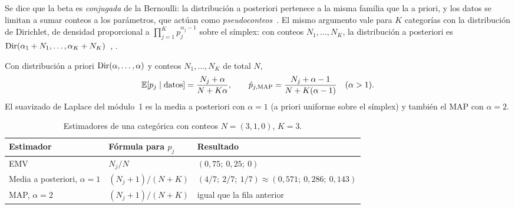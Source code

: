 Se dice que la beta es \emph{conjugada} de la Bernoulli: la distribución a posteriori pertenece a la misma familia que la a priori, y los datos se limitan a sumar conteos a los parámetros, que actúan como \emph{pseudoconteos}~\cite[clase~15]{mit1805}. El mismo argumento vale para $K$ categorías con la distribución de Dirichlet, de densidad proporcional a $\prod_{j=1}^{K}p_j^{\alpha_j-1}$ sobre el símplex: con conteos $N_1,\dots,N_K$, la distribución a posteriori es $\operatorname{Dir}(\alpha_1+N_1,\dots,\alpha_K+N_K)$~\cite[§2.2.1]{bishop}, \cite[§6.6]{mml}.

\begin{corolario}\label{cor:laplace}
Con distribución a priori $\operatorname{Dir}(\alpha,\dots,\alpha)$ y conteos $N_1,\dots,N_K$ de total $N$,
\[
\mathbb{E}[p_j\mid\text{datos}]=\frac{N_j+\alpha}{N+K\alpha},\qquad
\hat p_{j,\mathrm{MAP}}=\frac{N_j+\alpha-1}{N+K(\alpha-1)}\quad(\alpha>1).
\]
El suavizado de Laplace del módulo~1 es la media a posteriori con $\alpha=1$ (a priori uniforme sobre el símplex) y también el MAP con $\alpha=2$.
\end{corolario}

\begin{table}[h]
\centering\small
\caption{Estimadores de una categórica con conteos $N=(3,1,0)$, $K=3$.}\label{tab:estimadores}
\begin{tabular}{@{}lll@{}}
\toprule
Estimador & Fórmula para $p_j$ & Resultado \\
\midrule
EMV & $N_j/N$ & $(0{,}75;\ 0{,}25;\ 0)$ \\
Media a posteriori, $\alpha=1$ & $(N_j+1)/(N+K)$ & $(4/7;\ 2/7;\ 1/7)\approx(0{,}571;\ 0{,}286;\ 0{,}143)$ \\
MAP, $\alpha=2$ & $(N_j+1)/(N+K)$ & igual que la fila anterior \\
\bottomrule
\end{tabular}
\end{table}

\addtocounter{definicion}{1}%

